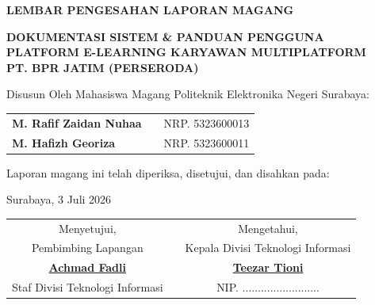\thispagestyle{empty}
\begin{center}
    {\fontsize{14pt}{16.8pt}\selectfont\bfseries LEMBAR PENGESAHAN LAPORAN MAGANG\par}
    \vspace{0.8cm}
    
    {\fontsize{12pt}{14.4pt}\selectfont\bfseries DOKUMENTASI SISTEM \& PANDUAN PENGGUNA\\
    PLATFORM E-LEARNING KARYAWAN MULTIPLATFORM\\
    PT. BPR JATIM (PERSERODA)\par}
    
    \vspace{1.0cm}
    
    {\fontsize{12pt}{14.4pt}\selectfont Disusun Oleh Mahasiswa Magang Politeknik Elektronika Negeri Surabaya: \par}
    \vspace{0.4cm}
    
    \begin{tabular}{lcl}
        \textbf{M. Rafif Zaidan Nuhaa} & \quad & NRP. 5323600013 \\
        \textbf{M. Hafizh Georiza} & \quad & NRP. 5323600011
    \end{tabular}
    
    \vspace{1.2cm}
    {\fontsize{12pt}{14.4pt}\selectfont Laporan magang ini telah diperiksa, disetujui, dan disahkan pada:\par}
    \vspace{0.2cm}
    {\fontsize{12pt}{14.4pt}\selectfont Surabaya, 3 Juli 2026\par}
    
    \vspace{1.8cm}
    
    \begin{tabular}{ccc}
        Menyetujui, & \quad\quad\quad\quad\quad & Mengetahui, \\
        Pembimbing Lapangan & \quad\quad\quad\quad\quad & Kepala Divisi Teknologi Informasi \\[2.0cm]
        \underline{\textbf{Achmad Fadli}} & \quad\quad\quad\quad\quad & \underline{\textbf{Teezar Tioni}} \\
        Staf Divisi Teknologi Informasi & \quad\quad\quad\quad\quad & NIP. .........................
    \end{tabular}
\end{center}
\newpage

